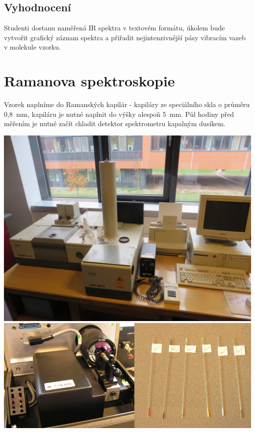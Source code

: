 \documentclass[12pt]{article}
\begin{document}
\subsection{Vyhodnocení}

Studenti dostanu naměřená IR spektra v textovém formátu, úkolem bude vytvořit grafický záznam spektra a přiřadit nejintenzivnější pásy vibracím vazeb v molekule vzorku.

\newpage
\section{Ramanova spektroskopie}

Vzorek naplníme do Ramanských kapilár - kapiláry ze speciálního skla o průměru 0,8~mm, kapiláru je nutné naplnit do výšky alespoň 5~mm. Půl hodiny před měřením je nutné začít chladit detektor spektrometru kapalným dusíkem.

\begin{center}
\includegraphics[keepaspectratio,width=\textwidth]{img/equinox.jpg}
\includegraphics[keepaspectratio,width=\textwidth]{img/raman.png}
\end{center}
\newpage
\end{document}
